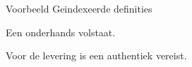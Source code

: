 \documentclass[12pt,dutch]{article}
\begin{document}
    \begin{center}
        \Huge Voorbeeld Geindexeerde definities
    \end{center}

    \label{art:defs}

    \label{art:gebruik}
    \begin{paras}
        \item \label{lid:onderhands} Een \gls{onderhands} volstaat.
        \item \label{lid:authentiek} Voor de levering is een \gls{authentiek} vereist.
    \end{paras}
\end{document}

